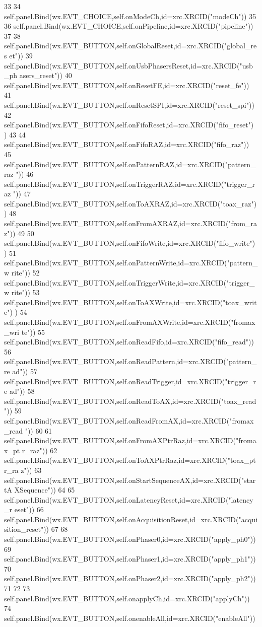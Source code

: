\begin{DoxyCode}
33 
34         self.panel.Bind(wx.EVT_CHOICE,self.onModeCh,id=xrc.XRCID("modeCh"))
35 
36         self.panel.Bind(wx.EVT_CHOICE,self.onPipeline,id=xrc.XRCID("pipeline"))
37 
38         self.panel.Bind(wx.EVT_BUTTON,self.onGlobalReset,id=xrc.XRCID("global_res
      et"))
39         self.panel.Bind(wx.EVT_BUTTON,self.onUsbPhasersReset,id=xrc.XRCID("usb_ph
      asers_reset"))
40         self.panel.Bind(wx.EVT_BUTTON,self.onResetFE,id=xrc.XRCID("reset_fe"))
41         self.panel.Bind(wx.EVT_BUTTON,self.onResetSPI,id=xrc.XRCID("reset_spi"))
42         self.panel.Bind(wx.EVT_BUTTON,self.onFifoReset,id=xrc.XRCID("fifo_reset")
      )
43 
44         self.panel.Bind(wx.EVT_BUTTON,self.onFifoRAZ,id=xrc.XRCID("fifo_raz"))
45         self.panel.Bind(wx.EVT_BUTTON,self.onPatternRAZ,id=xrc.XRCID("pattern_raz
      "))
46         self.panel.Bind(wx.EVT_BUTTON,self.onTriggerRAZ,id=xrc.XRCID("trigger_raz
      "))
47         self.panel.Bind(wx.EVT_BUTTON,self.onToAXRAZ,id=xrc.XRCID("toax_raz"))
48         self.panel.Bind(wx.EVT_BUTTON,self.onFromAXRAZ,id=xrc.XRCID("from_raz"))
49 
50         self.panel.Bind(wx.EVT_BUTTON,self.onFifoWrite,id=xrc.XRCID("fifo_write")
      )
51         self.panel.Bind(wx.EVT_BUTTON,self.onPatternWrite,id=xrc.XRCID("pattern_w
      rite"))
52         self.panel.Bind(wx.EVT_BUTTON,self.onTriggerWrite,id=xrc.XRCID("trigger_w
      rite"))
53         self.panel.Bind(wx.EVT_BUTTON,self.onToAXWrite,id=xrc.XRCID("toax_write")
      )
54         self.panel.Bind(wx.EVT_BUTTON,self.onFromAXWrite,id=xrc.XRCID("fromax_wri
      te"))
55         self.panel.Bind(wx.EVT_BUTTON,self.onReadFifo,id=xrc.XRCID("fifo_read"))
56         self.panel.Bind(wx.EVT_BUTTON,self.onReadPattern,id=xrc.XRCID("pattern_re
      ad"))
57         self.panel.Bind(wx.EVT_BUTTON,self.onReadTrigger,id=xrc.XRCID("trigger_re
      ad"))
58         self.panel.Bind(wx.EVT_BUTTON,self.onReadToAX,id=xrc.XRCID("toax_read"))
59         self.panel.Bind(wx.EVT_BUTTON,self.onReadFromAX,id=xrc.XRCID("fromax_read
      "))
60 
61         self.panel.Bind(wx.EVT_BUTTON,self.onFromAXPtrRaz,id=xrc.XRCID("fromax_pt
      r_raz"))
62         self.panel.Bind(wx.EVT_BUTTON,self.onToAXPtrRaz,id=xrc.XRCID("toax_ptr_ra
      z"))
63         self.panel.Bind(wx.EVT_BUTTON,self.onStartSequenceAX,id=xrc.XRCID("startA
      XSequence"))
64 
65         self.panel.Bind(wx.EVT_BUTTON,self.onLatencyReset,id=xrc.XRCID("latency_r
      eset"))
66         self.panel.Bind(wx.EVT_BUTTON,self.onAcquisitionReset,id=xrc.XRCID("acqui
      sition_reset"))
67 
68         self.panel.Bind(wx.EVT_BUTTON,self.onPhaser0,id=xrc.XRCID("apply_ph0"))
69         self.panel.Bind(wx.EVT_BUTTON,self.onPhaser1,id=xrc.XRCID("apply_ph1"))
70         self.panel.Bind(wx.EVT_BUTTON,self.onPhaser2,id=xrc.XRCID("apply_ph2"))
71 
72 
73         self.panel.Bind(wx.EVT_BUTTON,self.onapplyCh,id=xrc.XRCID("applyCh"))
74         self.panel.Bind(wx.EVT_BUTTON,self.onenableAll,id=xrc.XRCID("enableAll"))
      

\end{DoxyCode}
